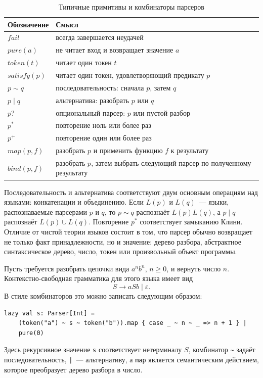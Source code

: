 \begin{table}[h]
    \centering
    \caption{Типичные примитивы и комбинаторы парсеров}
    \label{tbl:ParserCombinatorsBasic}
    \begin{tabular}{l|p{}}
        \hline
        Обозначение & Смысл \\
        \hline
        $\mathit{fail}$ & всегда завершается неудачей \\
        $\mathit{pure}(a)$ & не читает вход и возвращает значение $a$ \\
        $\mathit{token}(t)$ & читает один токен $t$ \\
        $\mathit{satisfy}(p)$ & читает один токен, удовлетворяющий предикату $p$ \\
        $p \mathbin{\sim} q$ & последовательность: сначала $p$, затем $q$ \\
        $p \mid q$ & альтернатива: разобрать $p$ или $q$ \\
        $p?$ & опциональный парсер: $p$ или пустой разбор \\
        $p^*$ & повторение ноль или более раз \\
        $p^+$ & повторение один или более раз \\
        $\mathit{map}(p,f)$ & разобрать $p$ и применить функцию $f$ к результату \\
        $\mathit{bind}(p,f)$ & разобрать $p$, затем выбрать следующий парсер по полученному результату \\
        \hline
    \end{tabular}
\end{table}

Последовательность и альтернатива соответствуют двум основным операциям над языками: конкатенации и объединению. Если $L(p)$ и $L(q)$~--- языки, распознаваемые парсерами $p$ и $q$, то $p \mathbin{\sim} q$ распознаёт $L(p)L(q)$, а $p \mid q$ распознаёт $L(p) \cup L(q)$. Повторение $p^*$ соответствует замыканию Клини. Отличие от чистой теории языков состоит в том, что парсер обычно возвращает не только факт принадлежности, но и значение: дерево разбора, абстрактное синтаксическое дерево, число, токен или произвольный объект программы.

\begin{example}
    Пусть требуется разобрать цепочки вида $a^n b^n$, $n \geq 0$, и вернуть число $n$. Контекстно-свободная грамматика для этого языка имеет вид
    \[
        S \to a S b \mid \varepsilon.
    \]
    В стиле комбинаторов это можно записать следующим образом:
    \begin{verbatim}
lazy val s: Parser[Int] =
    (token("a") ~ s ~ token("b")).map { case _ ~ n ~ _ => n + 1 } |
    pure(0)
    \end{verbatim}
    Здесь рекурсивное значение \texttt{s} соответствует нетерминалу $S$, комбинатор \texttt{\textasciitilde} задаёт последовательность, \texttt{|}~--- альтернативу, а \texttt{map} является семантическим действием, которое преобразует дерево разбора в число.
\end{example}

